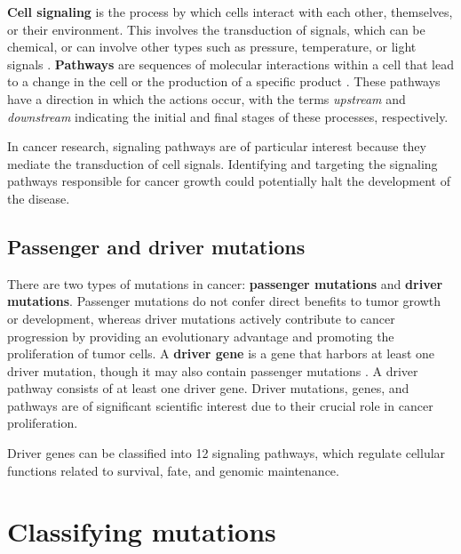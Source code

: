 \textbf{Cell signaling} is the process by which cells interact with each other, themselves, or their environment. This involves the transduction of signals, which can be chemical, or can involve other types such as pressure, temperature, or light signals \cite{cell_signaling}. \textbf{Pathways} are sequences of molecular interactions within a cell that lead to a change in the cell or the production of a specific product \cite{pathway}. These pathways have a direction in which the actions occur, with the terms \textit{upstream} and \textit{downstream} indicating the initial and final stages of these processes, respectively.

In cancer research, signaling pathways are of particular interest because they mediate the transduction of cell signals. Identifying and targeting the signaling pathways responsible for cancer growth could potentially halt the development of the disease. 

\subsection{Passenger and driver mutations}

There are two types of mutations in cancer: \textbf{passenger mutations} and \textbf{driver mutations}. Passenger mutations do not confer direct benefits to tumor growth or development, whereas driver mutations actively contribute to cancer progression by providing an evolutionary advantage and promoting the proliferation of tumor cells. A \textbf{driver gene} is a gene that harbors at least one driver mutation, though it may also contain passenger mutations . A driver pathway consists of at least one driver gene. Driver mutations, genes, and pathways are of significant scientific interest due to their crucial role in cancer proliferation.

Driver genes can be classified into 12 signaling pathways, which regulate cellular functions related to survival, fate, and genomic maintenance. 

\section{Classifying mutations}

